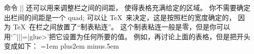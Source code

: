\danger 命令 |\halign| 还可以用来调整栏之间的间距，
使得表格充满给定的区域。%
你不需要确定出栏间的间距是一个 quad;
可以让 \TeX\ 来决定，这是按照栏的宽度确定的，
因为 \TeX\ 在栏之间放置了``制表粘连''。%
这个制表粘连一般是零，但是你可以用`^|\tabskip||=|\<glue>'把它设置为任何所要的值。%
例如，再讨论上面的表格，但是把开头变成如下：
\begintt
\tabskip=1em plus2em minus.5em
